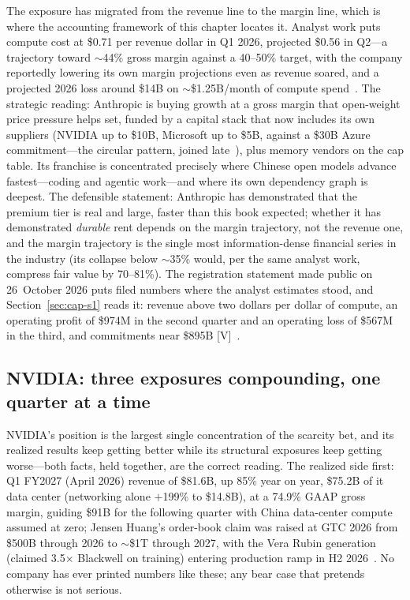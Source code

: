 The exposure has migrated from the revenue line to the margin line, which is where the accounting framework of this chapter locates it. Analyst work puts compute cost at \$0.71 per revenue dollar in Q1 2026, projected \$0.56 in Q2---a trajectory toward $\sim$44\% gross margin against a 40--50\% target, with the company reportedly lowering its own margin projections even as revenue soared, and a projected 2026 loss around \$14B on $\sim$\$1.25B/month of compute spend~\cite{anthropic-margin}. The strategic reading: Anthropic is buying growth at a gross margin that open-weight price pressure helps set, funded by a capital stack that now includes its own suppliers (NVIDIA up to \$10B, Microsoft up to \$5B, against a \$30B Azure commitment---the circular pattern, joined late~\cite{anthropic-msft-nvda}), plus memory vendors on the cap table. Its franchise is concentrated precisely where Chinese open models advance fastest---coding and agentic work---and where its own dependency graph is deepest. The defensible statement: Anthropic has demonstrated that the premium tier is real and large, faster than this book expected; whether it has demonstrated \emph{durable} rent depends on the margin trajectory, not the revenue one, and the margin trajectory is the single most information-dense financial series in the industry (its collapse below $\sim$35\% would, per the same analyst work, compress fair value by 70--81\%). The registration statement made public on 26~October 2026 puts filed numbers where the analyst estimates stood, and Section~\ref{sec:cap-s1} reads it: revenue above two dollars per dollar of compute, an operating profit of \$974M in the second quarter and an operating loss of \$567M in the third, and commitments near \$895B [V]~\cite{cap-anthropic-s1}.

\subsection{NVIDIA: three exposures compounding, one quarter at a time}

NVIDIA's position is the largest single concentration of the scarcity bet, and its realized results keep getting better while its structural exposures keep getting worse---both facts, held together, are the correct reading. The realized side first: Q1 FY2027 (April 2026) revenue of \$81.6B, up 85\% year on year, \$75.2B of it data center (networking alone $+$199\% to \$14.8B), at a 74.9\% GAAP gross margin, guiding \$91B for the following quarter with China data-center compute assumed at zero; Jensen Huang's order-book claim was raised at GTC 2026 from \$500B through 2026 to $\sim$\$1T through 2027, with the Vera Rubin generation (claimed 3.5$\times$ Blackwell on training) entering production ramp in H2 2026~\cite{nvidia2026,nvidia-gtc}. No company has ever printed numbers like these; any bear case that pretends otherwise is not serious.

